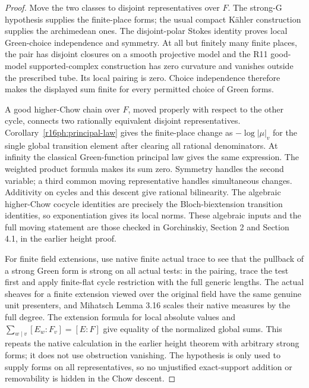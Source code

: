 \documentclass[11pt,a4paper]{article}
\theoremstyle{definition}
\theoremstyle{remark}
\numberwithin{equation}{section}
\begin{document}
\begin{proof}
Move the two classes to disjoint representatives over $F$.
The strong-G hypothesis supplies the finite-place forms; the
usual compact K\"ahler construction supplies the archimedean ones.
The disjoint-polar Stokes identity proves local Green-choice
independence and symmetry.  At all but finitely many finite places,
the pair has disjoint closures on a smooth projective model and
the R11 good-model supported-complex construction has zero
curvature and vanishes outside the prescribed tube.  Its local
pairing is zero.  Choice independence therefore makes the displayed
sum finite for every permitted choice of Green forms.

A good higher-Chow chain over $F$, moved properly with respect to
the other cycle, connects two rationally equivalent disjoint
representatives.  Corollary~\ref{r16ph:principal-law} gives the
finite-place change as $-\log|\mu|_v$ for the single global
transition element after clearing all rational denominators.
At infinity the classical Green-function principal law gives the
same expression.  The weighted product formula makes its sum zero.
Symmetry handles the second variable; a third common moving
representative handles simultaneous changes.  Additivity on cycles
and this descent give rational bilinearity.  The algebraic
higher-Chow cocycle identities are precisely the Bloch-biextension
transition identities, so exponentiation gives its local norms.
These algebraic inputs and the full moving statement are those
checked in Gorchinskiy, Section 2 and Section 4.1, in the earlier
height proof.

For finite field extensions, use native finite actual trace to
see that the pullback of a strong Green form is strong on all
actual tests: in the pairing, trace the test first and apply
finite-flat cycle restriction with the full generic lengths.
The actual sheaves for a finite extension viewed over the original
field have the same genuine unit presenters, and Mihatsch
Lemma 3.16 scales their native measures by the full degree.
The extension formula for local absolute values and
$\sum_{w\mid v}[E_w:F_v]=[E:F]$ give equality of the normalized
global sums.  This repeats the native calculation in the earlier
height theorem with arbitrary strong forms; it does not use
obstruction vanishing.  The hypothesis is only used to supply
forms on all representatives, so no unjustified exact-support
addition or removability is hidden in the Chow descent.
\end{proof}
\end{document}

